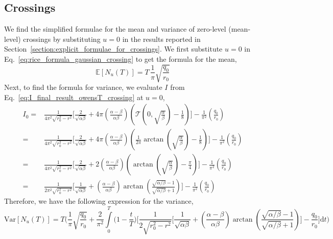 \documentclass[journal]{IEEEtran}
\theoremstyle{plain}
\theoremstyle{definition}
\theoremstyle{remark}
\newcommand{\E}{\mathbb{E}}
\newcommand{\Ot}{\mathcal{T}}
\newcommand{\Nu}{N_u(T)}
\newcommand{\dd}{\mathrm{d}}
\newcommand{\Var}{\text{Var}}
\begin{document}
\subsection{Crossings}
We find the simplified formulae for the mean and variance of zero-level (mean-level) crossings by substituting $u=0$ in the results reported in Section~\ref{section:explicit_formulae_for_crossings}. We first substitute $u=0$ in Eq.~\eqref{eq:rice_formula_gaussian_crossing} to get the formula for the mean,
\begin{equation}
    \E\left[\Nu\right] = T \, \frac{1}{\pi}\sqrt{\frac{q_0}{r_0}}
\end{equation}
Next, to find the formula for variance, we evaluate $I$ from Eq.~\eqref{eq:I_final_result_owensT_crossing} at $u=0$,
\begin{equation}
\begin{split}
    I_0 =& \frac{1}{4\pi^2\sqrt{r_0^2-r^2} }\Biggl[\frac{2}{\sqrt{\alpha\beta}} + 4\pi \left(\frac{\alpha - \beta}{\alpha\beta}\right) \left(\Ot\left(0, \sqrt{\frac{\alpha}{\beta}}\right) - \frac{1}{8}\right)\Biggr] - \frac{1}{\pi^2 }\left(\frac{q_0}{r_0}\right) \\
    =& \frac{1}{4\pi^2\sqrt{r_0^2-r^2}}\Biggl[\frac{2}{\sqrt{\alpha\beta}} + 4\pi \left(\frac{\alpha - \beta}{\alpha\beta}\right) \left(\frac{1}{2\pi}\arctan\left(\sqrt{\frac{\alpha}{\beta}}\right) - \frac{1}{8}\right)\Biggr] - \frac{1}{\pi^2 }\left(\frac{q_0}{r_0}\right) \\
    =& \frac{1}{4\pi^2\sqrt{r_0^2-r^2}}\Biggl[\frac{2}{\sqrt{\alpha\beta}} + 2 \left(\frac{\alpha - \beta}{\alpha\beta}\right)\left(\arctan\left(\sqrt{\frac{\alpha}{\beta}}\right) - \frac{\pi}{4}\right) \Biggr] - \frac{1}{\pi^2 }\left(\frac{q_0}{r_0}\right)\\
    =& \frac{1}{2\pi^2\sqrt{r_0^2-r^2}}\Biggl[\frac{1}{\sqrt{\alpha\beta}} + \left(\frac{\alpha - \beta}{\alpha\beta}\right) \arctan\left(\frac{\sqrt{\alpha/\beta}-1}{\sqrt{\alpha/\beta}+1}\right)\Biggr] - \frac{1}{\pi^2 }\left(\frac{q_0}{r_0}\right)
\end{split}
\end{equation}
Therefore, we have the following expression for the variance,
\begin{equation}
    \Var\left[\Nu\right] = T \Biggl(\frac{1}{\pi}\sqrt{\frac{q_0}{r_0}}  + \frac{2}{\pi^2}\int\limits_{0}^T \biggl(1-\frac{t}{T}\biggr)  \Biggl[\frac{1}{2\sqrt{r_0^2-r^2}}\Biggl[\frac{1}{\sqrt{\alpha\beta}}  + \left(\frac{\alpha - \beta}{\alpha\beta}\right) \arctan\left(\frac{\sqrt{\alpha/\beta}-1}{\sqrt{\alpha/\beta}+1}\right)\Biggr] - \frac{q_0}{r_0}\Biggr]  \dd t\Biggr)
\end{equation}
\end{document}
